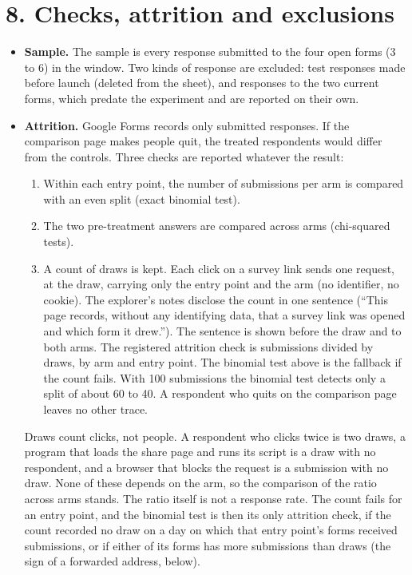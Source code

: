 \section{8. Checks, attrition and exclusions}\label{checks-attrition-and-exclusions}

\begin{itemize}
\item
  \textbf{Sample.} The sample is every response submitted to the four open forms (3 to 6) in the
  window. Two kinds of response are excluded: test responses made before launch (deleted from the
  sheet), and responses to the two current forms, which predate the experiment and are reported on
  their own.
\item
  \textbf{Attrition.} Google Forms records only submitted responses. If the comparison page makes people
  quit, the treated respondents would differ from the controls. Three checks are reported whatever
  the result:

  \begin{enumerate}
  \def\labelenumi{\arabic{enumi}.}
  \tightlist
  \item
    Within each entry point, the number of submissions per arm is compared with an even split
    (exact binomial test).
  \item
    The two pre-treatment answers are compared across arms (chi-squared tests).
  \item
    A count of draws is kept. Each click on a survey link sends one request, at the draw, carrying
    only the entry point and the arm (no identifier, no cookie). The explorer's notes disclose the
    count in one sentence (``This page records, without any identifying data, that a survey link
    was opened and which form it drew.''). The sentence is shown before the draw and to both arms.
    The registered attrition check is submissions divided by draws, by arm and entry point. The
    binomial test above is the fallback if the count fails. With 100 submissions the binomial test
    detects only a split of about 60 to 40. A respondent who quits on the comparison page leaves
    no other trace.
  \end{enumerate}

  Draws count clicks, not people. A respondent who clicks twice is two draws, a program that loads
  the share page and runs its script is a draw with no respondent, and a browser that blocks the
  request is a submission with no draw. None of these depends on the arm, so the comparison of the
  ratio across arms stands. The ratio itself is not a response rate. The count fails for an entry
  point, and the binomial test is then its only attrition check, if the count recorded no draw on a day on which that entry point's
  forms received submissions, or if either of its
  forms has more submissions than draws (the sign of a forwarded address, below).


\end{itemize}
